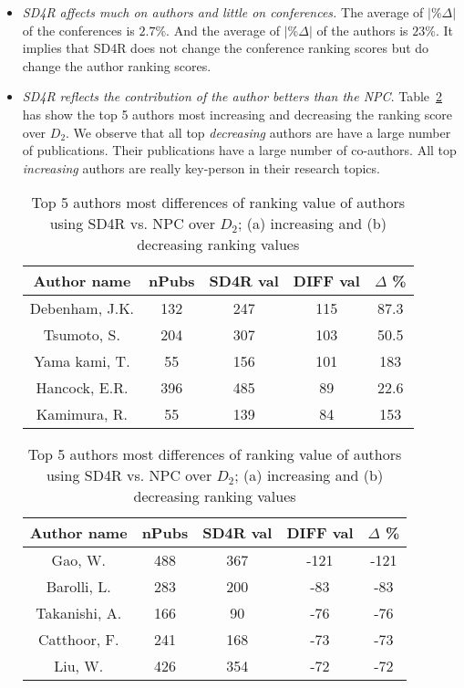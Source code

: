 \documentclass[lnicst]{svmultln}
\begin{document}
\begin{itemize}
\item\textit{SD4R affects much on authors and little on conferences.} The average of $|\%\Delta|$ of the conferences is $2.7\%$. And the average of $|\%\Delta|$ of the authors is $23\%$. It implies that SD4R does not change the conference ranking scores but do change the author ranking scores.  

\item\textit{SD4R reflects the contribution of the author betters than the NPC}. Table~\ref{fig:author} has show the top 5 authors most increasing and decreasing the ranking score over $D_2$. We observe that all top \textit{decreasing} authors are have a large number of publications. Their publications have a large number of co-authors. All top \textit{increasing} authors are really key-person in their research topics. 
\begin{table}
\begin{center}
\caption{Top 5 authors most differences of ranking value of authors using SD4R vs. NPC over $D_2$; (a) increasing and (b) decreasing ranking values}
\label{fig:author}
\begin{minipage}{2in}
\begin{center}
{\scriptsize
\begin{tabular}{c|c|c|c|c}
\hline
Author name	& nPubs	& SD4R val	& DIFF val	& $\Delta$ \% \\
\hline\hline
Debenham, J.K.	& 132	& 247	& 115	& 87.3 \\
Tsumoto, S.		& 204	& 307	& 103	& 50.5 \\
Yama	kami, T.		& 55		& 156	& 101	& 183 \\
Hancock, E.R.	& 396	& 485	& 89		& 22.6 \\
Kamimura, R. 	& 55		& 139	& 84		& 153 \\
\hline
\end{tabular}
}
\end{center}
\end{minipage}
  \qquad
\begin{minipage}{2in}
\begin{center}
{\scriptsize
\begin{tabular}{c|c|c|c|c}
\hline
Author name	& nPubs	& SD4R val	& DIFF val	& $\Delta$ \% \\
\hline\hline
Gao, W.			& 488	& 367	& -121	& -121 \\
Barolli, L.		& 283	& 200	& -83	& -83 \\
Takanishi, A.	& 166	& 90		& -76	& -76 \\
Catthoor, F.		& 241	& 168	& -73	& -73 \\
Liu, W.			& 426	& 354	& -72	& -72 \\
\hline
\end{tabular}
}
\end{center}
\end{minipage}
\end{center}
\end{table}


\end{itemize}
\end{document}
